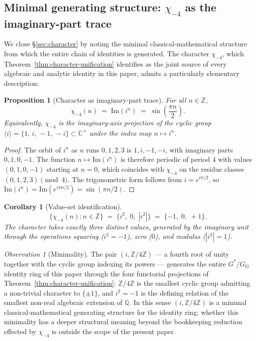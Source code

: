 \documentclass[11pt]{article}
\newtheorem{corollary}[theorem]{Corollary}
\newtheorem{proposition}[theorem]{Proposition}
\theoremstyle{definition}
\theoremstyle{remark}
\newtheorem*{observation}{Observation}
\newcommand{\Gs}{G^{*}}
\newcommand{\GG}{G_{\!\scriptscriptstyle\mathrm{G}}}
\newcommand{\Z}{\mathbb{Z}}
\newcommand{\Q}{\mathbb{Q}}
\newcommand{\C}{\mathbb{C}}
\begin{document}
\subsection{Minimal generating structure: $\chi_{-4}$ as the imaginary-part trace}\label{sec:zero-point}

We close \S\ref{sec:character} by noting the minimal
classical-mathematical structure from which the entire chain of
identities is generated.
The character $\chi_{-4}$, which Theorem~\ref{thm:character-unification}
identifies as the joint source of every algebraic and analytic identity
in this paper, admits a particularly elementary description:

\begin{proposition}[Character as imaginary-part trace]\label{prop:imaginary-trace}
For all $n \in \Z$,
\[
\chi_{-4}(n) \;=\; \mathrm{Im}(i^{n}) \;=\; \sin\!\left(\frac{\pi n}{2}\right).
\]
Equivalently, $\chi_{-4}$ is the imaginary-axis projection of the cyclic
group $\langle i\rangle = \{1,\,i,\,-1,\,-i\} \subset \C^{\times}$ under
the index map $n \mapsto i^{n}$.
\end{proposition}

\begin{proof}
The orbit of $i^{n}$ as $n$ runs $0, 1, 2, 3$ is $1, i, -1, -i$, with
imaginary parts $0, 1, 0, -1$. The function $n \mapsto \mathrm{Im}(i^{n})$
is therefore periodic of period $4$ with values $(0, 1, 0, -1)$ starting
at $n = 0$, which coincides with $\chi_{-4}$ on the residue classes
$(0, 1, 2, 3) \pmod 4$. The trigonometric form follows from
$i = e^{i\pi/2}$, so $\mathrm{Im}(i^{n}) = \mathrm{Im}(e^{i\pi n/2}) = \sin(\pi n/2)$.
\end{proof}

\begin{corollary}[Value-set identification]\label{cor:value-set}
\[
\{\chi_{-4}(n) : n \in \Z\} \;=\; \{i^{2},\;0,\;|i^{2}|\} \;=\; \{-1,\;0,\;+1\}.
\]
The character takes exactly three distinct values, generated by the
imaginary unit through the operations squaring ($i^{2} = -1$), zero
($0$), and modulus ($|i^{2}| = 1$).
\end{corollary}

\begin{observation}[Minimality]\label{obs:bedrock}
The pair $(i, \mathbb{Z}/4\Z)$ --- a fourth root of unity together with
the cyclic group indexing its powers --- generates the entire
$\Gs/\GG$ identity ring of this paper through the four functorial
projections of Theorem~\ref{thm:character-unification}: $\mathbb{Z}/4\Z$
is the smallest cyclic group admitting a non-trivial character to
$\{\pm 1\}$, and $i^{2} = -1$ is the defining relation of the smallest
non-real algebraic extension of $\Q$. In this sense $(i, \mathbb{Z}/4\Z)$
is a minimal classical-mathematical generating structure for the
identity ring; whether this minimality has a deeper structural meaning
beyond the bookkeeping reduction effected by $\chi_{-4}$ is outside the
scope of the present paper.
\end{observation}
\end{document}
